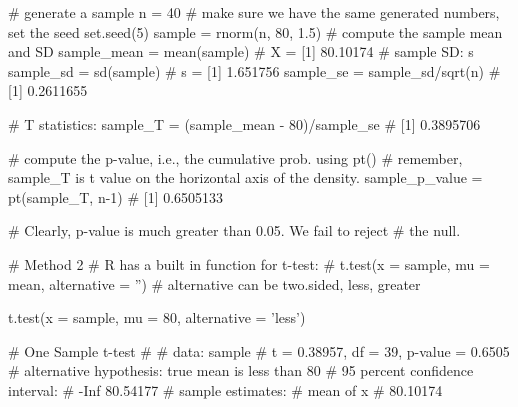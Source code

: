 \documentclass[12pt]{article}
\begin{document}
\begin{figure}[H]
\end{figure}









\begin{rc}
 
# generate a sample
n = 40
# make sure we have the same generated numbers, set the seed
set.seed(5)
sample = rnorm(n, 80, 1.5)
# compute the sample mean and SD
sample_mean = mean(sample)			# X = [1] 80.10174
# sample SD: s
sample_sd = sd(sample)				# s = [1] 1.651756
sample_se = sample_sd/sqrt(n)	# [1] 0.2611655

# T statistics:
sample_T = (sample_mean - 80)/sample_se		# [1] 0.3895706

# compute the p-value, i.e., the cumulative prob. using pt()
# remember, sample_T is t value on the horizontal axis of the density.
sample_p_value = pt(sample_T, n-1)		# [1] 0.6505133

# Clearly, p-value is much greater than 0.05. We fail to reject 
# the null.


# Method 2
# R has a built in function for t-test:
# t.test(x = sample, mu = mean, alternative = '')
# alternative can be two.sided, less, greater


t.test(x = sample, mu = 80, alternative = 'less')

#	        One Sample t-test
#	
#	data:  sample
#	t = 0.38957, df = 39, p-value = 0.6505
#	alternative hypothesis: true mean is less than 80
#	95 percent confidence interval:
#	     -Inf 80.54177
#	sample estimates:
#	mean of x
#	 80.10174

\end{rc}
\end{document}

